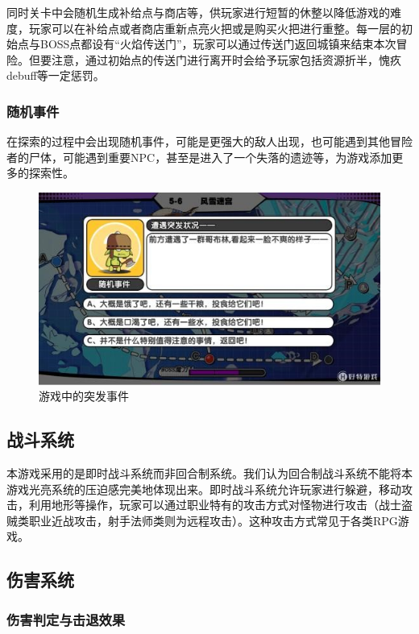 \documentclass[UTF8,AutoFakeBold=1,AutoFakeSlant,zihao=-4]{cucthesis}
\begin{document}
同时关卡中会随机生成补给点与商店等，供玩家进行短暂的休整以降低游戏的难度，玩家可以在补给点或者商店重新点亮火把或是购买火把进行重整。每一层的初始点与BOSS点都设有“火焰传送门”，玩家可以通过传送门返回城镇来结束本次冒险。但要注意，通过初始点的传送门进行离开时会给予玩家包括资源折半，愧疚debuff等一定惩罚。


\subsubsection{随机事件}

在探索的过程中会出现随机事件，可能是更强大的敌人出现，也可能遇到其他冒险者的尸体，可能遇到重要NPC，甚至是进入了一个失落的遗迹等，为游戏添加更多的探索性。

\begin{figure}[ht]
    \centering
    \includegraphics[scale=0.64]{imgs/突发事件.jpg}
    \caption{游戏中的突发事件}
\end{figure}


\subsection{战斗系统}

本游戏采用的是即时战斗系统而非回合制系统。我们认为回合制战斗系统不能将本游戏光亮系统的压迫感完美地体现出来。即时战斗系统允许玩家进行躲避，移动攻击，利用地形等操作，玩家可以通过职业特有的攻击方式对怪物进行攻击（战士盗贼类职业近战攻击，射手法师类则为远程攻击）。这种攻击方式常见于各类RPG游戏。


\subsection{伤害系统}

\subsubsection{伤害判定与击退效果}
\end{document}
